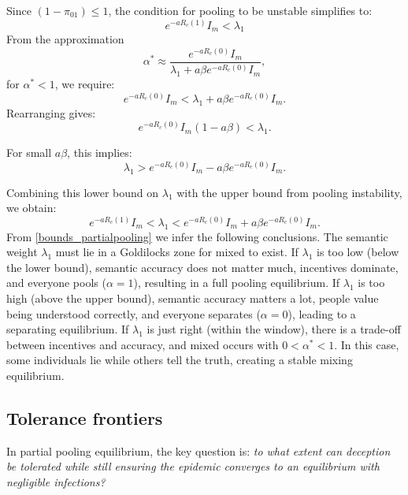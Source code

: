 \documentclass[sigconf,review]{acmart}
\begin{document}
Since $(1 - \pi_{01}) \leq 1$, the condition for pooling to be unstable simplifies to:
\begin{equation}
e^{-a R_c(1)} I_m < \lambda_1
\end{equation}
From the approximation
\begin{equation}
\alpha^* \approx \frac{e^{-a R_c(0)} I_m}{\lambda_1 + a \beta e^{-a R_c(0)} I_m},
\end{equation}
for $\alpha^* < 1$, we require:
\begin{equation}
e^{-a R_c(0)} I_m < \lambda_1 + a \beta e^{-a R_c(0)} I_m.
\end{equation}
Rearranging gives:
\begin{equation}
e^{-a R_c(0)} I_m (1 - a \beta) < \lambda_1.
\end{equation}

For small $a \beta$, this implies:
\begin{equation}
\lambda_1 > e^{-a R_c(0)} I_m - a \beta e^{-a R_c(0)} I_m.
\end{equation}

Combining this lower bound on $\lambda_1$ with the upper bound from pooling instability, we obtain:
\begin{equation}
e^{-a R_c(1)} I_m < \lambda_1 < e^{-a R_c(0)} I_m + a \beta e^{-a R_c(0)} I_m.
\label{bounds_partialpooling}
\end{equation}
From \eqref{bounds_partialpooling} we infer the following conclusions.
The semantic weight $\lambda_1$ must lie in a Goldilocks zone for mixed to exist. If $\lambda_1$ is too low (below the lower bound), semantic accuracy does not matter much, incentives dominate, and everyone pools ($\alpha = 1$), resulting in a full pooling equilibrium. If $\lambda_1$ is too high (above the upper bound), semantic accuracy matters a lot, people value being understood correctly, and everyone separates ($\alpha = 0$), leading to a separating equilibrium.
If $\lambda_1$ is just right (within the window), there is a trade-off between incentives and accuracy, and mixed occurs with $0 < \alpha^* < 1$. In this case, some individuals lie while others tell the truth, creating a stable mixing equilibrium.

\subsection{Tolerance frontiers}

In partial pooling equilibrium, the key question is: \emph{to what extent can deception be tolerated while still ensuring the epidemic converges to an equilibrium with negligible infections?}
\end{document}
